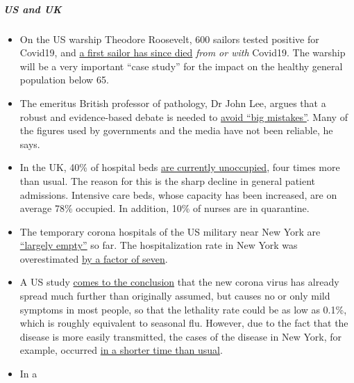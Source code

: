 \hypertarget{us-and-uk}{%
\subparagraph{\texorpdfstring{\textbf{US and
UK}}{US and UK}}\label{us-and-uk}}

\begin{itemize}
\tightlist
\item
  On the US warship Theodore Roosevelt, 600 sailors tested positive for
  Covid19, and
  \href{https://www.theguardian.com/world/2020/apr/14/sailor-dies-from-covid-19-and-600-test-positive-after-outbreak-on-uss-theodore-roosevelt-guam}{a
  first sailor has since died} \emph{from or with} Covid19. The warship
  will be a very important ``case study'' for the impact on the healthy
  general population below 65.
\item
  The emeritus British professor of pathology, Dr John Lee, argues that
  a robust and evidence-based debate is needed to
  \href{https://www.spectator.co.uk/article/to-understand-covid-we-need-evidence-scepticism-and-vigorous-debate}{avoid
  ``big mistakes''}. Many of the figures used by governments and the
  media have not been reliable, he says.
\item
  In the UK, 40\% of hospital beds
  \href{https://www.hsj.co.uk/acute-care/nhs-hospitals-have-four-times-more-empty-beds-than-normal/7027392.article}{are
  currently unoccupied}, four times more than usual. The reason for this
  is the sharp decline in general patient admissions. Intensive care
  beds, whose capacity has been increased, are on average 78\% occupied.
  In addition, 10\% of nurses are in quarantine.
\item
  The temporary corona hospitals of the US military near New York are
  \href{https://nypost.com/2020/04/09/usns-comfort-and-javits-center-mostly-empty-amid-coronavirus/}{``largely
  empty''} so far. The hospitalization rate in New York was
  overestimated
  \href{https://www.nytimes.com/2020/04/10/nyregion/new-york-coronavirus-hospitals.html}{by
  a factor of seven}.
\item
  A US study
  \href{https://www.medrxiv.org/content/10.1101/2020.04.01.20050542v1}{comes
  to the conclusion} that the new corona virus has already spread much
  further than originally assumed, but causes no or only mild symptoms
  in most people, so that the lethality rate could be as low as 0.1\%,
  which is roughly equivalent to seasonal flu. However, due to the fact
  that the disease is more easily transmitted, the cases of the disease
  in New York, for example, occurred \href{https://archive.is/7w2XE}{in
  a shorter time than usual}.
\item
  In a

\end{itemize}
